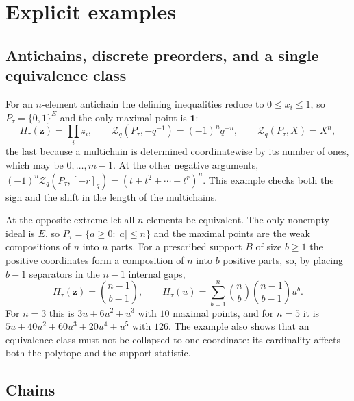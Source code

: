 \documentclass[11pt]{article}
\numberwithin{equation}{section}
\theoremstyle{definition}
\theoremstyle{remark}
\newcommand{\one}{\mathbf 1}
\newcommand{\qint}[1]{[#1]_q}
\newcommand{\Zeta}{\mathcal Z}
\newcommand{\zt}[1]{\mathbf z^{#1}}
\begin{document}
\section{Explicit examples}
\label{sec:examples}

\subsection{Antichains, discrete preorders, and a single equivalence class}

For an $n$-element antichain the defining inequalities reduce to $0\le x_i\le
1$, so $P_\tau=\{0,1\}^E$ and the only maximal point is $\one$:
\[
 H_\tau(\mathbf z)=\prod_iz_i,\qquad
 \Zeta_q(P_\tau,-q^{-1})=(-1)^nq^{-n},\qquad
 \Zeta_q(P_\tau,X)=X^n,
\]
the last because a multichain is determined coordinatewise by its number of
ones, which may be $0,\ldots,m-1$. At the other negative arguments,
$(-1)^n\Zeta_q(P_\tau,\qint{-r})=(t+t^2+\cdots+t^r)^n$. This example checks
both the sign and the shift in the length of the multichains.

At the opposite extreme let all $n$ elements be equivalent. The only nonempty
ideal is $E$, so $P_\tau=\{a\ge0:|a|\le n\}$ and the maximal points are the
weak compositions of $n$ into $n$ parts. For a prescribed support $B$ of size
$b\ge1$ the positive coordinates form a composition of $n$ into $b$ positive
parts, so, by placing $b-1$ separators in the $n-1$ internal gaps,
\begin{equation}
 [\zt B]H_\tau(\mathbf z)=\binom{n-1}{b-1},\qquad
 H_\tau(u)=\sum_{b=1}^n\binom nb\binom{n-1}{b-1}u^b.
 \label{eq:one-class}
\end{equation}
For $n=3$ this is $3u+6u^2+u^3$ with $10$ maximal points, and for $n=5$ it is
$5u+40u^2+60u^3+20u^4+u^5$ with $126$. The example also shows that an
equivalence class must not be collapsed to one coordinate: its cardinality
affects both the polytope and the support statistic.

\subsection{Chains}
\end{document}
